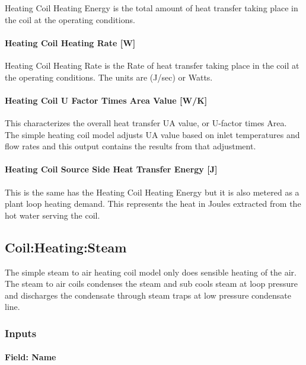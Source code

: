 Heating Coil Heating Energy is the total amount of heat transfer taking place in the coil at the operating conditions.

\paragraph{Heating Coil Heating Rate {[}W{]}}\label{heating-coil-heating-rate-w}

Heating Coil Heating Rate is the Rate of heat transfer taking place in the coil at the operating conditions. The units are (J/sec) or Watts.

\paragraph{Heating Coil U Factor Times Area Value {[}W/K{]}}\label{heating-coil-u-factor-times-area-value-wk}

This characterizes the overall heat transfer UA value, or U-factor times Area. The simple heating coil model adjusts UA value based on inlet temperatures and flow rates and this output contains the results from that adjustment.

\paragraph{Heating Coil Source Side Heat Transfer Energy {[}J{]}}\label{heating-coil-source-side-heat-transfer-energy-j}

This is the same has the Heating Coil Heating Energy but it is also metered as a plant loop heating demand. This represents the heat in Joules extracted from the hot water serving the coil.

\subsection{Coil:Heating:Steam}\label{coilheatingsteam}

The simple steam to air heating coil model only does sensible heating of the air. The steam to air coils condenses the steam and sub cools steam at loop pressure and discharges the condensate through steam traps at low pressure condensate line.

\subsubsection{Inputs}\label{inputs-2-019}

\paragraph{Field: Name}\label{field-name-2-018}


